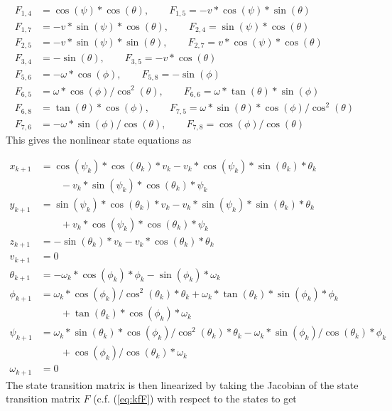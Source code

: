 \begin{align*}
F_{1,4} &= \cos(\psi)*\cos(\theta), \qquad F_{1,5} = -v*\cos(\psi)*\sin(\theta) \\
F_{1,7} &= -v*\sin(\psi)*\cos(\theta), \qquad F_{2,4} = \sin(\psi)*\cos(\theta) \\
F_{2,5} &= -v*\sin(\psi)*\sin(\theta), \qquad F_{2,7} = v*\cos(\psi)*\cos(\theta) \\
F_{3,4} &= -\sin(\theta), \qquad F_{3,5} = -v*\cos(\theta) \\
F_{5,6} &= -\omega *\cos(\phi), \qquad F_{5,8} = -\sin(\phi) \\
F_{6,5} &= \omega *\cos(\phi)/\cos^2(\theta), \qquad F_{6,6} = \omega *\tan(\theta)*\sin(\phi) \\
F_{6,8} &= \tan(\theta)*\cos(\phi), \qquad F_{7,5} = \omega *\sin(\theta)*\cos(\phi)/\cos^2(\theta) \\
F_{7,6} &= -\omega *\sin(\phi)/\cos(\theta), \qquad F_{7,8} = \cos(\phi)/\cos(\theta)
\end{align*}
This gives the nonlinear state equations as

\begin{align*}
x_{k+1} &= \cos(\psi_k)*\cos(\theta_k)*v_k - v_k*\cos(\psi_k)*\sin(\theta_k)*\theta_k \\
&\qquad- v_k*\sin(\psi_k)*\cos(\theta_k)*\psi_k \\
y_{k+1} &= \sin(\psi_k)*\cos(\theta_k)*v_k - v_k*\sin(\psi_k)*\sin(\theta_k)*\theta_k \\
&\qquad+ v_k*\cos(\psi_k)*\cos(\theta_k)*\psi_k \\
z_{k+1} &= -\sin(\theta_k)*v_k - v_k*\cos(\theta_k)*\theta_k \\
v_{k+1} &= 0 \\
\theta_{k+1} &= -\omega_k *\cos(\phi_k)*\phi_k - \sin(\phi_k)*\omega_k \\
\phi_{k+1} &= \omega_k *\cos(\phi_k)/\cos^2(\theta_k)*\theta_k + \omega_k *\tan(\theta_k)*\sin(\phi_k)*\phi_k \\
&\qquad+ \tan(\theta_k)*\cos(\phi_k)*\omega_k \\
\psi_{k+1} &= \omega_k *\sin(\theta_k)*\cos(\phi_k)/\cos^2(\theta_k)*\theta_k - \omega_k *\sin(\phi_k)/\cos(\theta_k)*\phi_k \\
&\qquad+ \cos(\phi_k)/\cos(\theta_k)*\omega_k \\
\omega_{k+1} &= 0
\end{align*}
The state transition matrix is then linearized by taking the Jacobian of the state transition matrix $F$ (c.f. (\ref{eq:kfF}) with respect to the states to get

